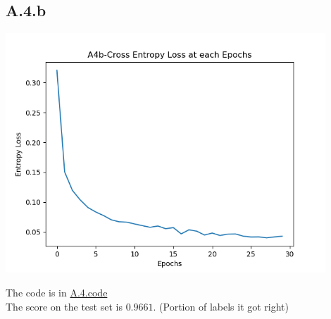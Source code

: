 \documentclass[]{article}
\begin{document}
    \subsection*{A.4.b} 
        \begin{center}
            \includegraphics[width=12cm]{A4Mnist/A4(b)-NN-mnist.png}
        \end{center}
        The code is in \hyperref[A.4.code]{A.4.code}
        \\
        The score on the test set is $0.9661$. (Portion of labels it got right)
\end{document}
